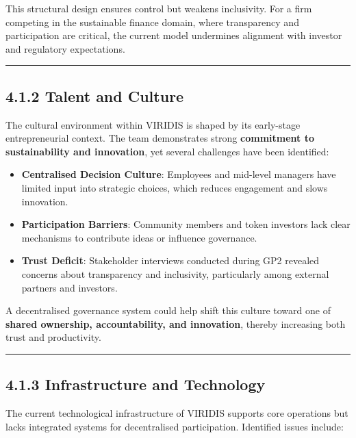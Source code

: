 \documentclass[
  english,
  12pt,
  oneside,
  open=any]{scrbook}
\providecommand{\tightlist}{%
  \setlength{\itemsep}{0pt}\setlength{\parskip}{0pt}}\usepackage{longtable,booktabs,array}
\begin{document}
This structural design ensures control but weakens inclusivity. For a
firm competing in the sustainable finance domain, where transparency and
participation are critical, the current model undermines alignment with
investor and regulatory expectations.

\begin{center}\rule{0.5\linewidth}{0.5pt}\end{center}

\subsection{4.1.2 Talent and Culture}\label{sec-culture}

The cultural environment within VIRIDIS is shaped by its early-stage
entrepreneurial context. The team demonstrates strong \textbf{commitment
to sustainability and innovation}, yet several challenges have been
identified:

\begin{itemize}
\tightlist
\item
  \textbf{Centralised Decision Culture}: Employees and mid-level
  managers have limited input into strategic choices, which reduces
  engagement and slows innovation.\\
\item
  \textbf{Participation Barriers}: Community members and token investors
  lack clear mechanisms to contribute ideas or influence governance.\\
\item
  \textbf{Trust Deficit}: Stakeholder interviews conducted during GP2
  revealed concerns about transparency and inclusivity, particularly
  among external partners and investors.
\end{itemize}

A decentralised governance system could help shift this culture toward
one of \textbf{shared ownership, accountability, and innovation},
thereby increasing both trust and productivity.

\begin{center}\rule{0.5\linewidth}{0.5pt}\end{center}

\subsection{4.1.3 Infrastructure and Technology}\label{sec-it}

The current technological infrastructure of VIRIDIS supports core
operations but lacks integrated systems for decentralised participation.
Identified issues include:
\end{document}
